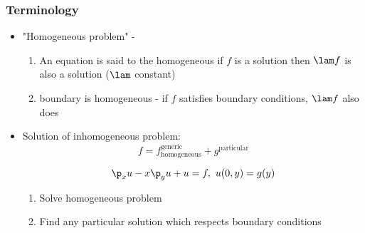 \documentclass[Maths.tex]{subfiles}
\begin{document}
\subsection{Terminology}
\begin{itemize}
	\item "Homogeneous problem" -
	\begin{enumerate}
		\item An equation is said to the homogeneous if $f$ is a solution then $\lam f$ is also a solution ($\lam$ constant)
		\item boundary is homogeneous - if $f$ satisfies boundary conditions, $\lam f$ also does
	\end{enumerate}
	\item Solution of inhomogeneous problem:
	\begin{equation}
		f = f_{\text{homogeneous}}^{\text{generic}} + g^{\text{particular}}
	\end{equation}
	\begin{example}
	\begin{equation}
		\p_xu - x\p_yu + u = f,~ u(0,y) = g(y)
	\end{equation}
	\begin{enumerate}
		\item Solve homogeneous problem
		\item Find any particular solution which respects boundary conditions
	\end{enumerate}
	\end{example}
\end{itemize}

\chapter{}
\end{document}
